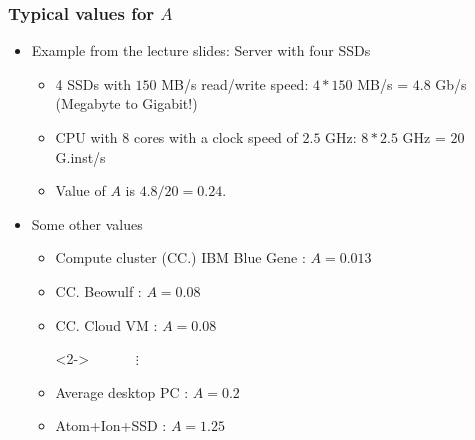 \begin{frame}
\frametitle{Typical values for $A$}

\begin{itemize}
	\item<1-> Example from the lecture slides: Server with four SSDs
	\begin{itemize}
		\item<1-> 4 SSDs with $150$ MB/s read/write speed: $4 * 150$ MB/s = $4.8$ Gb/s (Megabyte to Gigabit!)
		\item<1-> CPU with 8 cores with a clock speed of $2.5$ GHz: $8 * 2.5$ GHz = $20$ G.inst/s
		\item<1-> Value of $A$ is $4.8 / 20 = 0.24$.
	\end{itemize}
	\item<2-> Some other values
	\begin{itemize}
		\item<2-> Compute cluster (CC.) IBM Blue Gene : $A = 0.013$
		\item<2-> CC. Beowulf : $A = 0.08$
		\item<2-> CC. Cloud VM : $A = 0.08$
		\item[]<2-> $\quad\quad\quad\vdots$
		\item<2-> Average desktop PC : $A = 0.2$
		\item<2-> Atom+Ion+SSD : $A = 1.25$
	\end{itemize}
\end{itemize}

\end{frame}


